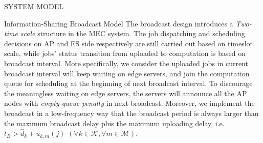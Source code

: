 \documentclass[10pt, conference, letterpaper]{IEEEtran}
\newcommand{\apSet}{\mathcal{K}}
\newcommand{\esSet}{\mathcal{M}}
\begin{document}
\begin{section}{SYSTEM MODEL}
\begin{subsection}{Information-Sharing Broadcast Model}
            The broadcast design introduces a \emph{Two-time scale} structure in the MEC system.
            The job dispatching and scheduling decisions on AP and ES side respectively are still carried out based on timeslot scale, while jobs' status transition from uploaded to computation is based on broadcast interval.
            More specifically, we consider the uploaded jobs in current broadcast interval will keep waiting on edge servers, and join the computation queue for scheduling at the beginning of next broadcast interval.
            {\color{red}To discourage the meaningless waiting on edge servers, the servers will announce all the AP nodes with \emph{empty-queue penalty} in next broadcast. Moreover, we implement the broadcast in a low-frequency way that the broadcast period is always larger than the maximum broadcast delay plus the maximum uploading delay, i.e. $t_B > \hat{d}_{k} + u_{k,m}(j)$ $(\forall k\in\apSet, \forall m\in\esSet)$.}
        \end{subsection}
    \end{section}
\end{document}
